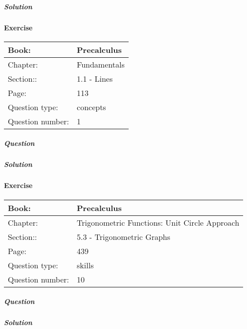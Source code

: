 \documentclass{article}
\begin{document}
            \subparagraph{Solution}
            
            
            \newpage
            \paragraph{Exercise}\par
            \noindent
            \begin{tabularx}{1\textwidth}{
                    p{}
                    p{}
                }
                \toprule
                Book: & Precalculus
                \\
                \midrule
                Chapter: & Fundamentals
                \\
                \midrule
                Section:: & 1.1 - Lines
                \\
                \midrule
                Page: & 113
                \\
                \midrule
                Question type: & concepts
                \\
                \midrule
                Question number: & 1
                \\
                \bottomrule
            \end{tabularx}
            \subparagraph{Question}
            
            \subparagraph{Solution}
            
            
            \newpage
            \paragraph{Exercise}\par
            \noindent
            \begin{tabularx}{1\textwidth}{
                    p{}
                    p{}
                }
                \toprule
                Book: & Precalculus
                \\
                \midrule
                Chapter: & Trigonometric Functions: Unit Circle Approach
                \\
                \midrule
                Section:: & 5.3 - Trigonometric Graphs
                \\
                \midrule
                Page: & 439
                \\
                \midrule
                Question type: & skills
                \\
                \midrule
                Question number: & 10
                \\
                \bottomrule
            \end{tabularx}
            \subparagraph{Question}
            
            \subparagraph{Solution}
            
            
        
\end{document}
